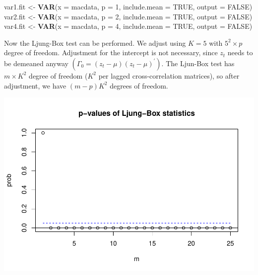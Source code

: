 \documentclass[12pt,a4paper]{article}
\newenvironment{Shaded}{\begin{snugshade}}{\end{snugshade}}
\newcommand{\DataTypeTok}[1]{\textcolor[rgb]{0.13,0.29,0.53}{#1}}
\newcommand{\DecValTok}[1]{\textcolor[rgb]{0.00,0.00,0.81}{#1}}
\newcommand{\KeywordTok}[1]{\textcolor[rgb]{0.13,0.29,0.53}{\textbf{#1}}}
\newcommand{\NormalTok}[1]{#1}
\newcommand{\OperatorTok}[1]{\textcolor[rgb]{0.81,0.36,0.00}{\textbf{#1}}}
\newcommand{\OtherTok}[1]{\textcolor[rgb]{0.56,0.35,0.01}{#1}}
\newcommand{\StringTok}[1]{\textcolor[rgb]{0.31,0.60,0.02}{#1}}
\begin{document}
\begin{Shaded}
\begin{Highlighting}[]
\NormalTok{var1.fit <-}\StringTok{ }\KeywordTok{VAR}\NormalTok{(}\DataTypeTok{x =}\NormalTok{ macdata, }\DataTypeTok{p =} \DecValTok{1}\NormalTok{, }\DataTypeTok{include.mean =} \OtherTok{TRUE}\NormalTok{, }\DataTypeTok{output =} \OtherTok{FALSE}\NormalTok{)}
\NormalTok{var2.fit <-}\StringTok{ }\KeywordTok{VAR}\NormalTok{(}\DataTypeTok{x =}\NormalTok{ macdata, }\DataTypeTok{p =} \DecValTok{2}\NormalTok{, }\DataTypeTok{include.mean =} \OtherTok{TRUE}\NormalTok{, }\DataTypeTok{output =} \OtherTok{FALSE}\NormalTok{)}
\NormalTok{var4.fit <-}\StringTok{ }\KeywordTok{VAR}\NormalTok{(}\DataTypeTok{x =}\NormalTok{ macdata, }\DataTypeTok{p =} \DecValTok{4}\NormalTok{, }\DataTypeTok{include.mean =} \OtherTok{TRUE}\NormalTok{, }\DataTypeTok{output =} \OtherTok{FALSE}\NormalTok{)}
\end{Highlighting}
\end{Shaded}

Now the Ljung-Box test can be performed. We adjust using \(K = 5\) with
\(5^2 \times p\) degree of freedom. Adjustment for the intercept is not
necessary, since \(z_t\) needs to be demeaned anyway
\(\left(\Gamma_0 = \left(z_t - \mu \right) \left( z_t - \mu \right)^{'} \right)\).
The Ljun-Box test has \(m \times K^2\) degree of freedom (\(K^2\) per
lagged cross-correlation matrices), so after adjustment, we have
\((m - p) K^2\) degrees of freedom.

\begin{Shaded}
\end{Shaded}

\includegraphics{solution_exercise_5_files/figure-latex/unnamed-chunk-10-1.pdf}
\end{document}
